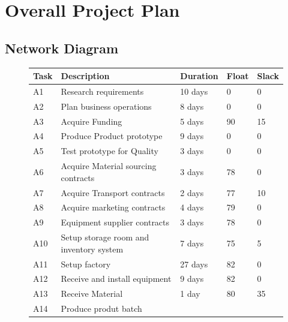 \documentclass{article}
\title{}
\author{}
\begin{document}
\large

\section{Overall Project Plan}
\subsection{Network Diagram}
    \begin{figure}[H]
      \centering
      \begin{tabular}{|p{0.65cm}|p{5cm}|p{3cm}|l|l|} \hline
        \textbf{Task} & \textbf{Description} &
        \textbf{Duration} & \textbf{Float} & \textbf{Slack}
        \\ \hline
        \rowcolor{green!10} A1  & Research requirements    &
        10 days  & 0 & 0 \\ \hline
        \rowcolor{green!15} A2  & Plan business operations &
        8 days  & 0 & 0 \\ \hline
        \rowcolor{green!20} A3  & Acquire Funding    &
        5 days  & 90 & 15 \\ \hline
        \rowcolor{green!25} A4  & Produce Product prototype &
        9 days  & 0 & 0 \\ \hline
        \rowcolor{green!30} A5  & Test prototype for Quality &
        3 days  & 0 & 0 \\ \hline
        \rowcolor{green!35} A6  & Acquire Material sourcing contracts &
        3 days  & 78 & 0 \\ \hline
        \rowcolor{green!40} A7  & Acquire Transport contracts &
        2 days  & 77 & 10 \\ \hline
        \rowcolor{blue!10} A8  & Acquire marketing contracts &
        4 days  & 79 & 0 \\ \hline
        \rowcolor{blue!15} A9  & Equipment supplier contracts &
        3 days & 78 & 0 \\ \hline
        \rowcolor{blue!20} A10 & Setup storage room and inventory system &
        7 days  & 75 & 5 \\ \hline
        \rowcolor{blue!25} A11 & Setup factory &
        27 days & 82 & 0 \\ \hline
        \rowcolor{blue!30} A12 & Receive and install equipment &
        9 days  & 82 & 0 \\ \hline
        \rowcolor{blue!35} A13 & Receive Material &
        1 day & 80 & 35 \\ \hline
        \rowcolor{blue!40} A14 & Produce produt batch &

\end{tabular}
\end{figure}
\end{document}
